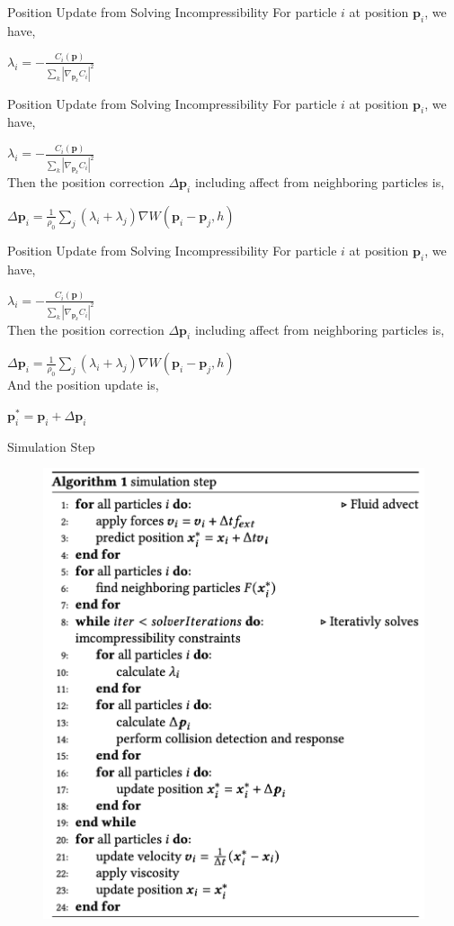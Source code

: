 \documentclass[aspectratio=169,xcolor=dvipsnames]{beamer}
\newcommand{\vect}[1]{\boldsymbol{#1}}
\begin{document}
\begin{frame}{Position Update from Solving Incompressibility}
    For particle $i$ at position $\vect{p}_i$, we have,

    $  \lambda_i = -\frac{C_i(\vect{p})}{\sum_k |\nabla_{\vect{p}_k} C_i|^2}$ \\[2ex]
    
\end{frame}

\begin{frame}{Position Update from Solving Incompressibility}
    For particle $i$ at position $\vect{p}_i$, we have,

    $  \lambda_i = -\frac{C_i(\vect{p})}{\sum_k |\nabla_{\vect{p}_k} C_i|^2}$ \\[2ex]

    Then the position correction $\Delta \vect{p}_i$ including affect from neighboring particles is,

    $\Delta \vect{p}_i = \frac{1}{\rho_0} \sum_j (\lambda_i + \lambda_j) \nabla W(\vect{p}_i - \vect{p}_j , h)$ \\[2ex]
    
\end{frame}

\begin{frame}{Position Update from Solving Incompressibility}
    For particle $i$ at position $\vect{p}_i$, we have,

    $  \lambda_i = -\frac{C_i(\vect{p})}{\sum_k |\nabla_{\vect{p}_k} C_i|^2}$ \\[2ex]

    Then the position correction $\Delta \vect{p}_i$ including affect from neighboring particles is,

    $\Delta \vect{p}_i = \frac{1}{\rho_0} \sum_j (\lambda_i + \lambda_j) \nabla W(\vect{p}_i - \vect{p}_j , h)$ \\[2ex]

    And the position update is,

    $\vect{p}_i^* = \vect{p}_i + \Delta \vect{p}_i$

    
\end{frame}

\begin{frame}{Simulation Step}
    \begin{figure}
    \includegraphics[width=0.4\linewidth]{../image/algorithm.png}
    \end{figure}

\end{frame}
\end{document}
